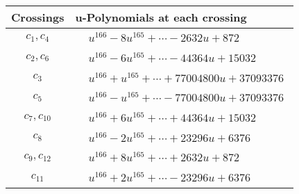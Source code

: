 \documentclass[1p]{elsarticle_modified}
\theoremstyle{definition}
\begin{document}
\begin{tabular}{m{50pt}|m{274pt}}
Crossings & \hspace{64pt}u-Polynomials at each crossing \\
\hline $$\begin{aligned}c_{1},c_{4}\end{aligned}$$&$\begin{aligned}
&u^{166}-8 u^{165}+\cdots-2632 u+872
\end{aligned}$\\
\hline $$\begin{aligned}c_{2},c_{6}\end{aligned}$$&$\begin{aligned}
&u^{166}-6 u^{165}+\cdots-44364 u+15032
\end{aligned}$\\
\hline $$\begin{aligned}c_{3}\end{aligned}$$&$\begin{aligned}
&u^{166}+u^{165}+\cdots+77004800 u+37093376
\end{aligned}$\\
\hline $$\begin{aligned}c_{5}\end{aligned}$$&$\begin{aligned}
&u^{166}- u^{165}+\cdots-77004800 u+37093376
\end{aligned}$\\
\hline $$\begin{aligned}c_{7},c_{10}\end{aligned}$$&$\begin{aligned}
&u^{166}+6 u^{165}+\cdots+44364 u+15032
\end{aligned}$\\
\hline $$\begin{aligned}c_{8}\end{aligned}$$&$\begin{aligned}
&u^{166}-2 u^{165}+\cdots+23296 u+6376
\end{aligned}$\\
\hline $$\begin{aligned}c_{9},c_{12}\end{aligned}$$&$\begin{aligned}
&u^{166}+8 u^{165}+\cdots+2632 u+872
\end{aligned}$\\
\hline $$\begin{aligned}c_{11}\end{aligned}$$&$\begin{aligned}
&u^{166}+2 u^{165}+\cdots-23296 u+6376
\end{aligned}$\\
\hline
\end{tabular}\\~\\
\end{document}
